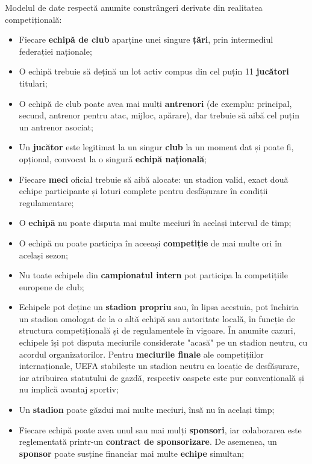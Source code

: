 \documentclass{article}
\begin{document}
	Modelul de date respectă anumite constrângeri derivate din realitatea competițională:
	
	\begin{itemize}
		\item Fiecare \textbf{echipă de club} aparține unei singure \textbf{țări}, prin intermediul federației naționale;
		
		\item O echipă trebuie să dețină un lot activ compus din cel puțin 11 \textbf{jucători} titulari;
		
		\item O echipă de club poate avea mai mulți \textbf{antrenori} (de exemplu: principal, secund, antrenor pentru atac, mijloc, apărare), dar trebuie să aibă cel puțin un antrenor asociat;
		
		\item Un \textbf{jucător} este legitimat la un singur \textbf{club} la un moment dat și poate fi, opțional, convocat la o singură \textbf{echipă națională};
		
		\item Fiecare \textbf{meci} oficial trebuie să aibă alocate: un stadion valid, exact două echipe participante și loturi complete pentru desfășurare în condiții regulamentare;
		
		\item O \textbf{echipă} nu poate disputa mai multe meciuri în același interval de timp;
		
		\item O echipă nu poate participa în aceeași \textbf{competiție} de mai multe ori în același sezon;
		
		\item Nu toate echipele din \textbf{campionatul intern} pot participa la competițiile europene de club; 	%
		
		\item Echipele pot deține un \textbf{stadion propriu} sau, în lipsa acestuia, pot închiria un stadion omologat de la o altă echipă sau autoritate locală, în funcție de structura competițională și de regulamentele în vigoare. În anumite cazuri, echipele își pot disputa meciurile considerate "acasă" pe un stadion neutru, cu acordul organizatorilor. Pentru \textbf{meciurile finale} ale competițiilor internaționale, UEFA stabilește un stadion neutru ca locație de desfășurare, iar atribuirea statutului de gazdă, respectiv oaspete este pur convențională și nu implică avantaj sportiv;
		
		\item Un \textbf{stadion} poate găzdui mai multe meciuri, însă nu în același timp;
		
		\item Fiecare echipă poate avea unul sau mai mulți \textbf{sponsori}, iar colaborarea este reglementată printr-un \textbf{contract de sponsorizare}. De asemenea, un \textbf{sponsor} poate susține financiar mai multe \textbf{echipe} simultan;
		
	\end{itemize}
	\vspace{0.5cm}
	
\end{document}
